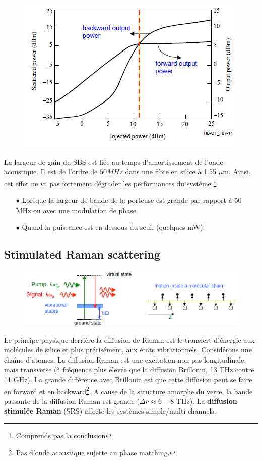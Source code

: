 \begin{figure}
	\vspace{-5mm}
	\includegraphics[scale=0.55]{ch6/image27}
	\end{figure}
	
La largeur de gain du SBS est liée au temps d'amortissement de l'onde acoustique. Il est de
l'ordre de $50 MHz$ dans une fibre en silice à 1.55 $\mu$m. Ainsi, cet effet ne va pas
fortement dégrader les performances du système \footnote{Comprends pas la conclusion}

\begin{itemize}
\item[$\bullet$] Lorsque la largeur de bande de la porteuse est grande par rapport à 50 MHz ou 
avec une modulation de phase.
\item[$\bullet$] Quand la puissance est en dessous du seuil (quelques mW). 
\end{itemize}


\subsection{Stimulated Raman scattering}
\begin{figure}
	\vspace{-5mm}
	\includegraphics[scale=0.55]{ch6/image28}
	\end{figure}
Le principe physique derrière la diffusion de Raman est le transfert d'énergie aux molécules
de silice et plus précisément, aux états vibrationnels. Considérons une chaîne d'atomes. La
diffusion Raman est une excitation non pas longitudinale, mais transverse (à fréquence plus
élevée que la diffusion Brillouin, 13 THz contre 11 GHz). La grande différence avec Brillouin
est que cette diffusion peut se faire en forward et en backward\footnote{Pas d'onde acoustique
sujette au phase matching.}. A cause de la structure amorphe du verre, la bande passante de 
la diffusion Raman est grande ($\Delta \nu \approx 6-8$ THz). La \textbf{diffusion stimulée 
Raman} (SRS) affecte les systèmes simple/multi-channels. 


